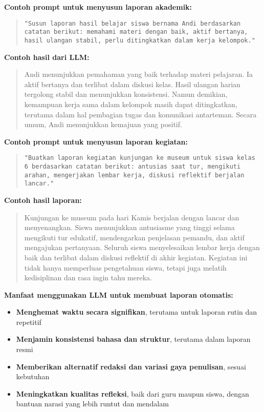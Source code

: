 \textbf{Contoh prompt untuk menyusun laporan akademik:}

\begin{quote}
	\centering
	\texttt{"Susun laporan hasil belajar siswa bernama Andi berdasarkan catatan berikut: memahami materi dengan baik, aktif bertanya, hasil ulangan stabil, perlu ditingkatkan dalam kerja kelompok."}
\end{quote}

\textbf{Contoh hasil dari LLM:}

\begin{quote}
	Andi menunjukkan pemahaman yang baik terhadap materi pelajaran. Ia aktif bertanya dan terlibat dalam diskusi kelas. Hasil ulangan harian tergolong stabil dan menunjukkan konsistensi. Namun demikian, kemampuan kerja sama dalam kelompok masih dapat ditingkatkan, terutama dalam hal pembagian tugas dan komunikasi antarteman. Secara umum, Andi menunjukkan kemajuan yang positif.
\end{quote}

\textbf{Contoh prompt untuk menyusun laporan kegiatan:}

\begin{quote}
	\centering
	\texttt{"Buatkan laporan kegiatan kunjungan ke museum untuk siswa kelas 6 berdasarkan catatan berikut: antusias saat tur, mengikuti arahan, mengerjakan lembar kerja, diskusi reflektif berjalan lancar."}
\end{quote}

\textbf{Contoh hasil laporan:}

\begin{quote}
	Kunjungan ke museum pada hari Kamis berjalan dengan lancar dan menyenangkan. Siswa menunjukkan antusiasme yang tinggi selama mengikuti tur edukatif, mendengarkan penjelasan pemandu, dan aktif mengajukan pertanyaan. Seluruh siswa menyelesaikan lembar kerja dengan baik dan terlibat dalam diskusi reflektif di akhir kegiatan. Kegiatan ini tidak hanya memperluas pengetahuan siswa, tetapi juga melatih kedisiplinan dan rasa ingin tahu mereka.
\end{quote}

\textbf{Manfaat menggunakan LLM untuk membuat laporan otomatis:}
\begin{itemize}
	\item \textbf{Menghemat waktu secara signifikan}, terutama untuk laporan rutin dan repetitif
	\item \textbf{Menjamin konsistensi bahasa dan struktur}, terutama dalam laporan resmi
	\item \textbf{Memberikan alternatif redaksi dan variasi gaya penulisan}, sesuai kebutuhan
	\item \textbf{Meningkatkan kualitas refleksi}, baik dari guru maupun siswa, dengan bantuan narasi yang lebih runtut dan mendalam
\end{itemize}

